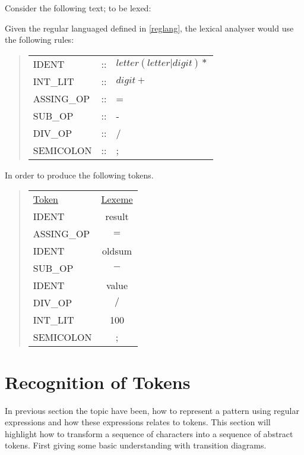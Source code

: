 \begin{example} \label{codeToToken}$ $\\
Consider the following text; to be lexed:
\begin{quote}

\end{quote}
Given the regular languaged defined in \cref{reglang}, the lexical analyser would use the following rules:
\begin{quote}
\begin{tabular}{l c l}
IDENT & :: & $letter(letter|digit)*$\\
INT\_LIT & :: & $digit+$\\
ASSING\_OP & :: & =\\
SUB\_OP & :: & -\\
DIV\_OP & :: & /\\
SEMICOLON & :: & ;
\end{tabular}
\end{quote}
In order to produce the following tokens.
\begin{quote}
\begin{tabular}{l c}
\underline{Token} & \underline{Lexeme}\\
IDENT & result\\
ASSING\_OP & $=$\\
IDENT & oldsum\\
SUB\_OP & $-$\\
IDENT & value\\
DIV\_OP & $/$\\
INT\_LIT & 100\\
SEMICOLON & ;
\end{tabular}
\end{quote}
\end{example}

\section{Recognition of Tokens}
In previous section the topic have been, how to represent a pattern using 
regular expressions and how these expressions relates to tokens. This section 
will highlight how to transform a sequence of characters into a sequence of 
abstract tokens. First giving some basic understanding with transition diagrams.  

